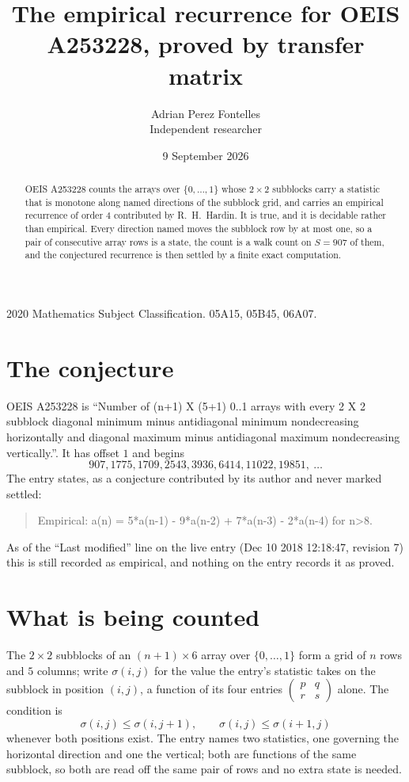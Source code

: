 \documentclass[11pt,a4paper]{article}
\title{The empirical recurrence for OEIS A253228, proved by transfer matrix}
\author{Adrian Perez Fontelles\\ \small Independent researcher}
\date{9 September 2026}
\theoremstyle{plain}
\theoremstyle{definition}
\begin{document}
\maketitle

\begin{abstract}
OEIS A253228 counts the arrays over $\{0,\dots,1\}$ whose $2\times2$ subblocks carry a
statistic that is monotone along named directions of the subblock grid, and carries an
empirical recurrence of order $4$ contributed by R.~H.~Hardin. It is true, and it is
decidable rather than empirical. Every direction named moves the subblock row by at most one,
so a pair of consecutive array rows is a state, the count is a walk count on $S=907$ of them,
and the conjectured recurrence is then settled by a finite exact computation.
\end{abstract}

\noindent\small 2020 Mathematics Subject Classification. 05A15, 05B45, 06A07.\normalsize

\section{The conjecture}

OEIS A253228 is ``Number of (n+1) X (5+1) 0..1 arrays with every 2 X 2 subblock diagonal minimum minus antidiagonal minimum nondecreasing horizontally and diagonal maximum minus antidiagonal maximum nondecreasing vertically.''. It has offset $1$ and begins
\[
907, 1775, 1709, 2543, 3936, 6414, 11022, 19851,\ \dots
\]
The entry states, as a conjecture contributed by its author and never marked settled:
\begin{quote}
Empirical: a(n) = 5*a(n-1) - 9*a(n-2) + 7*a(n-3) - 2*a(n-4) for n>8.
\end{quote}
As of the ``Last modified'' line on the live entry (Dec 10 2018 12:18:47, revision 7) this is still
recorded as empirical, and nothing on the entry records it as proved.

\section{What is being counted}

The $2\times2$ subblocks of an $(n+1)\times6$ array over $\{0,\dots,1\}$ form a grid
of $n$ rows and $5$ columns; write $\sigma(i,j)$ for the value the entry's statistic takes on
the subblock in position $(i,j)$, a function of its four entries
$\begin{pmatrix}p&q\\r&s\end{pmatrix}$ alone. The condition is
\[
\sigma(i,j)\le\sigma(i,j+1),\qquad \sigma(i,j)\le\sigma(i+1,j)
\]
whenever both positions exist. The entry names two statistics, one governing the horizontal direction and one the vertical; both are functions of the same subblock, so both are read off the same pair of rows and no extra state is needed.
\end{document}
